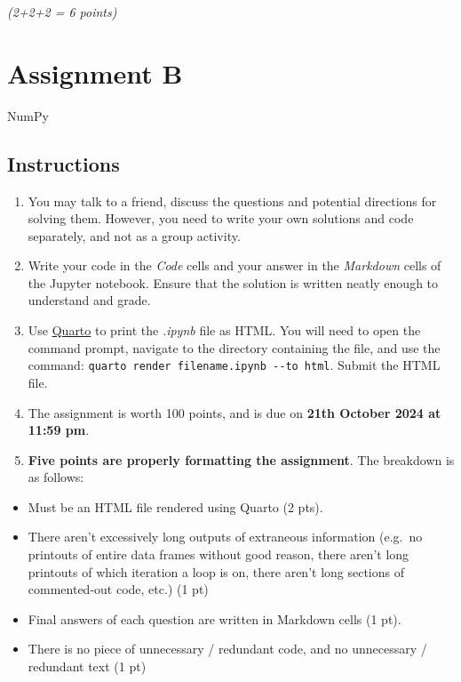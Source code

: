 \documentclass[
  letterpaper,
  DIV=11,
  numbers=noendperiod]{scrreprt}
\providecommand{\tightlist}{%
  \setlength{\itemsep}{0pt}\setlength{\parskip}{0pt}}\usepackage{longtable,booktabs,array}
\begin{document}
\emph{(2+2+2 = 6 points)}

\hypertarget{assignment-b}{%
\chapter{Assignment B}\label{assignment-b}}

NumPy

\hfill\break

\hypertarget{instructions-3}{%
\section*{Instructions}\label{instructions-3}}


\begin{enumerate}
\def\labelenumi{\arabic{enumi}.}
\item
  You may talk to a friend, discuss the questions and potential
  directions for solving them. However, you need to write your own
  solutions and code separately, and not as a group activity.
\item
  Write your code in the \emph{Code} cells and your answer in the
  \emph{Markdown} cells of the Jupyter notebook. Ensure that the
  solution is written neatly enough to understand and grade.
\item
  Use
  \href{https://quarto.org/docs/output-formats/html-basics.html}{Quarto}
  to print the \emph{.ipynb} file as HTML. You will need to open the
  command prompt, navigate to the directory containing the file, and use
  the command: \texttt{quarto\ render\ filename.ipynb\ -\/-to\ html}.
  Submit the HTML file.
\item
  The assignment is worth 100 points, and is due on \textbf{21th October
  2024 at 11:59 pm}.
\item
  \textbf{Five points are properly formatting the assignment}. The
  breakdown is as follows:
\end{enumerate}

\begin{itemize}
\tightlist
\item
  Must be an HTML file rendered using Quarto (2 pts).
\item
  There aren't excessively long outputs of extraneous information
  (e.g.~no printouts of entire data frames without good reason, there
  aren't long printouts of which iteration a loop is on, there aren't
  long sections of commented-out code, etc.) (1 pt)
\item
  Final answers of each question are written in Markdown cells (1 pt).
\item
  There is no piece of unnecessary / redundant code, and no unnecessary
  / redundant text (1 pt)
\end{itemize}
\end{document}
